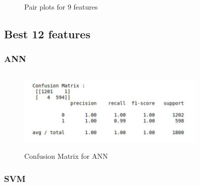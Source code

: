 \begin{figure}[H]
  \noindent{}
\caption{Pair plots for 9 features}
\end{figure}

\subsection{Best 12 features}

\subsubsection{ANN}

\begin{figure}[H]
  \includegraphics[height = 4cm,width= 9cm]{images/12_ANN}
\caption{Confusion Matrix for ANN}
\end{figure}

\subsubsection{SVM}

